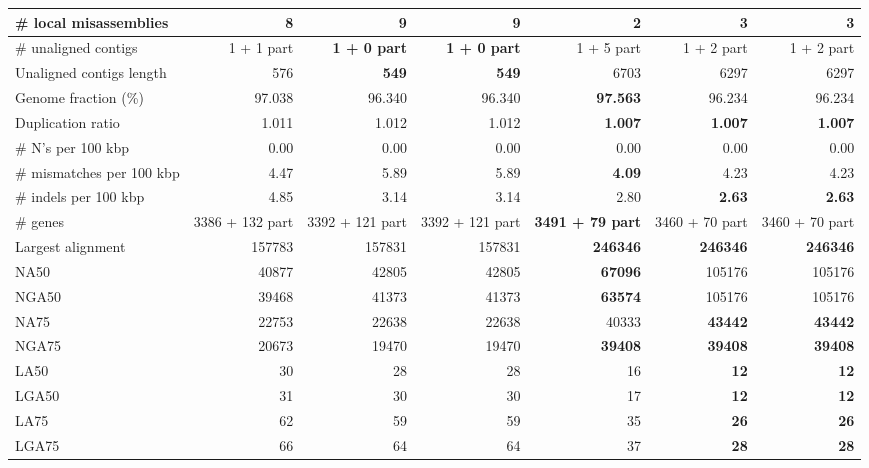 \documentclass[12pt,a4paper]{article}
\begin{document}
\begin{table}[ht]
\begin{center}
\begin{tabular}{|l*{6}{|r}|}
\# local misassemblies & 8 & 9 & 9 & {\bf 2} & 3 & 3 \\ \hline
\# unaligned contigs & 1 + 1 part & {\bf 1 + 0 part} & {\bf 1 + 0 part} & 1 + 5 part & 1 + 2 part & 1 + 2 part \\ \hline
Unaligned contigs length & 576 & {\bf 549} & {\bf 549} & 6703 & 6297 & 6297 \\ \hline
Genome fraction (\%) & 97.038 & 96.340 & 96.340 & {\bf 97.563} & 96.234 & 96.234 \\ \hline
Duplication ratio & 1.011 & 1.012 & 1.012 & {\bf 1.007} & {\bf 1.007} & {\bf 1.007} \\ \hline
\# N's per 100 kbp & 0.00 & 0.00 & 0.00 & 0.00 & 0.00 & 0.00 \\ \hline
\# mismatches per 100 kbp & 4.47 & 5.89 & 5.89 & {\bf 4.09} & 4.23 & 4.23 \\ \hline
\# indels per 100 kbp & 4.85 & 3.14 & 3.14 & 2.80 & {\bf 2.63} & {\bf 2.63} \\ \hline
\# genes & 3386 + 132 part & 3392 + 121 part & 3392 + 121 part & {\bf 3491 + 79 part} & 3460 + 70 part & 3460 + 70 part \\ \hline
Largest alignment & 157783 & 157831 & 157831 & {\bf 246346} & {\bf 246346} & {\bf 246346} \\ \hline
NA50 & 40877 & 42805 & 42805 & {\bf 67096} & 105176 & 105176 \\ \hline
NGA50 & 39468 & 41373 & 41373 & {\bf 63574} & 105176 & 105176 \\ \hline
NA75 & 22753 & 22638 & 22638 & 40333 & {\bf 43442} & {\bf 43442} \\ \hline
NGA75 & 20673 & 19470 & 19470 & {\bf 39408} & {\bf 39408} & {\bf 39408} \\ \hline
LA50 & 30 & 28 & 28 & 16 & {\bf 12} & {\bf 12} \\ \hline
LGA50 & 31 & 30 & 30 & 17 & {\bf 12} & {\bf 12} \\ \hline
LA75 & 62 & 59 & 59 & 35 & {\bf 26} & {\bf 26} \\ \hline
LGA75 & 66 & 64 & 64 & 37 & {\bf 28} & {\bf 28} \\ \hline
\end{tabular}
\end{center}
\end{table}
\end{document}
